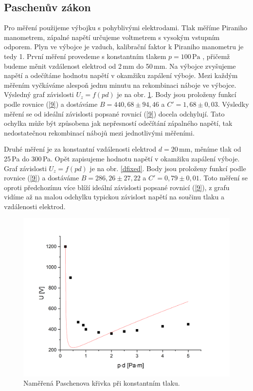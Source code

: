 \documentclass[a4paper,12pt]{article}
\begin{document}
\subsection{Paschenův zákon}
Pro měření použijeme výbojku s pohyblivými elektrodami. Tlak měříme Piraniho manometrem, zápalné napětí určujeme voltmetrem s vysokým vstupním odporem. Plyn ve výbojce je vzduch, kalibrační faktor k Piraniho manometru je tedy 1. První měření provedeme s konstantním tlakem $p = 100\,\si{\pascal}$ , přičemž budeme měnit vzdálenost elektrod od 2\,\si{\milli\meter} do 50\,\si{\milli\meter}. Na výbojce zvyšujeme napětí a odečítáme hodnotu napětí v okamžiku zapálení výboje. Mezi každým měřením vyčkáváme alespoň jednu minutu na rekombinaci náboje ve výbojce. Výsledný graf závislosti $U_z = f(pd)$ je na obr. \ref{tlakfixed}. Body jsou proloženy funkcí podle rovnice (\ref{9}) a dostáváme $B = 440,68 \pm 94,46$ a $C' = 1,68 \pm 0,03$. Výsledky měření se od ideální závislosti popsané rovnicí (\ref{9}) docela odchylují. Tato ochylka může být způsobena jak nepřesností odečítání zápalného napětí, tak nedostatečnou rekombinací nábojů mezi jednotlivými měřeními. 

Druhé měření je za konstantní vzdálenosti elektrod $d = 20\,\si{\milli\meter}$, měníme tlak od 25\,\si{\pascal} do 300\,\si{\pascal}. Opět zapisujeme hodnotu napětí v okamžiku zapálení výboje. Graf závislosti $U_z = f(pd)$ je na obr. \ref{dfixed}. Body jsou proloženy funkcí podle rovnice (\ref{9}) a dostáváme $B = 286,26 \pm 27,22$ a $C' = 0,79 \pm 0,01$. Toto měření se oproti předchozímu více blíží ideální závislosti popsané rovnicí (\ref{9}), z grafu vidíme až na malou odchylku typickou závislost napětí na součinu tlaku a vzdálenosti elektrod.


\begin{figure}[h]
	\centering
	\includegraphics[width=130mm]{tlakfixed.png}
	\caption{Naměřená Paschenova křivka při konstantním tlaku.}
	\label{tlakfixed}
\end{figure}
\end{document}
